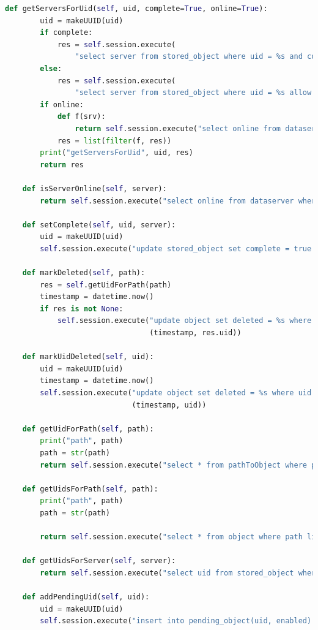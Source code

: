 \documentclass[11pt,a4paper,english]{article}
\begin{document}
\begin{lstlisting}[language=Python, title=Codice]
    def getServersForUid(self, uid, complete=True, online=True):
        uid = makeUUID(uid)
        if complete:
            res = self.session.execute(
                "select server from stored_object where uid = %s and complete = true allow filtering", (uid, )).all()
        else:
            res = self.session.execute(
                "select server from stored_object where uid = %s allow filtering", (uid, )).all()
        if online:
            def f(srv):
                return self.session.execute("select online from dataserver where server = %s", (srv.server, )).one().online
            res = list(filter(f, res))
        print("getServersForUid", uid, res)
        return res

    def isServerOnline(self, server):
        return self.session.execute("select online from dataserver where server = %s", (server, )).one().online

    def setComplete(self, uid, server):
        uid = makeUUID(uid)
        self.session.execute("update stored_object set complete = true where uid = %s and server = %s", (uid, server))

    def markDeleted(self, path):
        res = self.getUidForPath(path)
        timestamp = datetime.now()
        if res is not None:
            self.session.execute("update object set deleted = %s where uid = %s",
                                 (timestamp, res.uid))

    def markUidDeleted(self, uid):
        uid = makeUUID(uid)
        timestamp = datetime.now()
        self.session.execute("update object set deleted = %s where uid = %s",
                             (timestamp, uid))

    def getUidForPath(self, path):
        print("path", path)
        path = str(path)
        return self.session.execute("select * from pathToObject where path = %s", (path, )).one()

    def getUidsForPath(self, path):
        print("path", path)
        path = str(path)

        return self.session.execute("select * from object where path like %s", (path, )).all()

    def getUidsForServer(self, server):
        return self.session.execute("select uid from stored_object where server = %s allow filtering", (server, ))

    def addPendingUid(self, uid):
        uid = makeUUID(uid)
        self.session.execute("insert into pending_object(uid, enabled) values (%s, True)", (uid, ))


\end{lstlisting}
\end{document}
